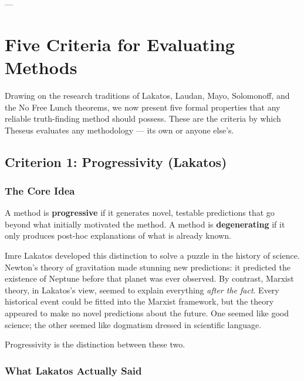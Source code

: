 \documentclass[11pt,letterpaper]{article}
\begin{document}
---

\newpage


\section{Five Criteria for Evaluating Methods}

Drawing on the research traditions of Lakatos, Laudan, Mayo, Solomonoff, and the No Free Lunch theorems, we now present five formal properties that any reliable truth-finding method should possess. These are the criteria by which Theseus evaluates any methodology — its own or anyone else's.


\subsection{Criterion 1: Progressivity (Lakatos)}

\subsubsection*{The Core Idea}

A method is \textbf{progressive} if it generates novel, testable predictions that go beyond what initially motivated the method. A method is \textbf{degenerating} if it only produces post-hoc explanations of what is already known.

Imre Lakatos developed this distinction to solve a puzzle in the history of science. Newton's theory of gravitation made stunning new predictions: it predicted the existence of Neptune before that planet was ever observed. By contrast, Marxist theory, in Lakatos's view, seemed to explain everything \emph{after the fact}. Every historical event could be fitted into the Marxist framework, but the theory appeared to make no novel predictions about the future. One seemed like good science; the other seemed like dogmatism dressed in scientific language.

Progressivity is the distinction between these two.

\subsubsection*{What Lakatos Actually Said}
\end{document}
